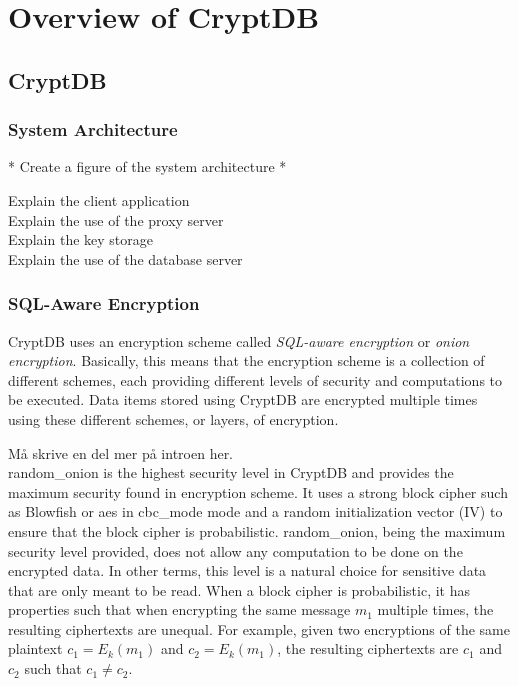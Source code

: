 \chapter{Overview of CryptDB}
\label{chp:overview_cryptDB}

\section{CryptDB}

\subsection{System Architecture}


* Create a figure of the system architecture *

Explain the client application\\
Explain the use of the proxy server\\
Explain the key storage\\
Explain the use of the database server\\

\subsection{SQL-Aware Encryption}

CryptDB uses an encryption scheme called \emph{SQL-aware encryption} or \textit{onion encryption}. Basically, this means that the encryption scheme is a collection of different schemes, each providing different levels of security and computations to be executed. Data items stored using CryptDB are encrypted multiple times using these different schemes, or layers, of encryption.

Må skrive en del mer på introen her.\\

\Gls{random_onion} is the highest security level in CryptDB and provides the maximum security found in encryption scheme. It uses a strong block cipher such as Blowfish or \Gls{aes} in \Gls{cbc_mode} mode and a random initialization vector (IV) to ensure that the block cipher is probabilistic. \Gls{random_onion}, being the maximum security level provided, does not allow any computation to be done on the encrypted data. In other terms, this level is a natural choice for sensitive data that are only meant to be read. When a block cipher is probabilistic, it has properties such that when encrypting the same message $m_1$ multiple times, the resulting ciphertexts are unequal. For example, given two encryptions of the same plaintext $c_1 = E_k(m_1)$ and $c_2 = E_k(m_1)$, the resulting ciphertexts are $c_1$ and $c_2$ such that $c_1 \neq c_2$.




